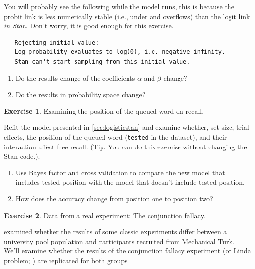 \documentclass[12pt,]{krantz}
\providecommand{\tightlist}{%
  \setlength{\itemsep}{0pt}\setlength{\parskip}{0pt}}
\theoremstyle{definition}
\theoremstyle{definition}
\theoremstyle{definition}
\newtheorem{exercise}{Exercise}[chapter]
\theoremstyle{remark}
\begin{document}
You will probably see the following while the model runs, this is
because the probit link is less numerically stable (i.e., under and
overflows) than the logit link \emph{in Stan}. Don't worry, it is good
enough for this exercise.

\begin{verbatim}
   Rejecting initial value:
   Log probability evaluates to log(0), i.e. negative infinity.
   Stan can't start sampling from this initial value.
\end{verbatim}

\begin{enumerate}
\def\labelenumi{\alph{enumi}.}
\tightlist
\item
  Do the results change of the coefficients \(\alpha\) and \(\beta\)
  change?
\item
  Do the results in probability space change?
\end{enumerate}

\begin{exercise}
\protect\hypertarget{exr:logisticstan}{}{\label{exr:logisticstan} }Examining
the position of the queued word on recall. \end{exercise}

Refit the model presented in \ref{sec:logisticstan} and examine whether,
set size, trial effects, the position of the queued word
(\texttt{tested} in the dataset), and their interaction affect free
recall. (Tip: You can do this exercise without changing the Stan code.).

\begin{enumerate}
\def\labelenumi{\alph{enumi}.}
\tightlist
\item
  Use Bayes factor and cross validation to compare the new model that
  includes tested position with the model that doesn't include tested
  position.
\item
  How does the accuracy change from position one to position two?
\end{enumerate}

\begin{exercise}
\protect\hypertarget{exr:fallacy}{}{\label{exr:fallacy} }Data from a real
experiment: The conjunction fallacy. \end{exercise}

\citet{Paolaccietal} examined whether the results of some classic
experiments differ between a university pool population and participants
recruited from Mechanical Turk. We'll examine whether the results of the
conjunction fallacy experiment (or Linda problem;
\citet{TverskyKahneman1983}) are replicated for both groups.
\end{document}
